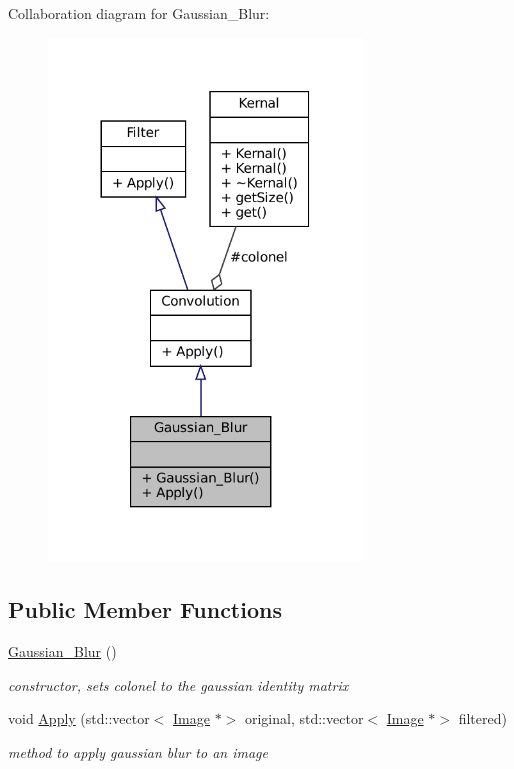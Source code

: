 Collaboration diagram for Gaussian\+\_\+\+Blur\+:
\nopagebreak
\begin{figure}[H]
\begin{center}
\leavevmode
\includegraphics[width=236pt]{classGaussian__Blur__coll__graph}
\end{center}
\end{figure}
\subsection*{Public Member Functions}
\begin{DoxyCompactItemize}
\item 
\mbox{\label{classGaussian__Blur_a6578511e43e84f3c7bc9356324df223e}} 
\hyperlink{classGaussian__Blur_a6578511e43e84f3c7bc9356324df223e}{Gaussian\+\_\+\+Blur} ()
\begin{DoxyCompactList}\small\item\em constructor, sets colonel to the gaussian identity matrix \end{DoxyCompactList}\item 
\mbox{\label{classGaussian__Blur_aac260e4900fda92755855a6d52d1be0d}} 
void \hyperlink{classGaussian__Blur_aac260e4900fda92755855a6d52d1be0d}{Apply} (std\+::vector$<$ \hyperlink{classImage}{Image} $\ast$$>$ original, std\+::vector$<$ \hyperlink{classImage}{Image} $\ast$$>$ filtered)
\begin{DoxyCompactList}\small\item\em method to apply gaussian blur to an image \end{DoxyCompactList}\end{DoxyCompactItemize}
